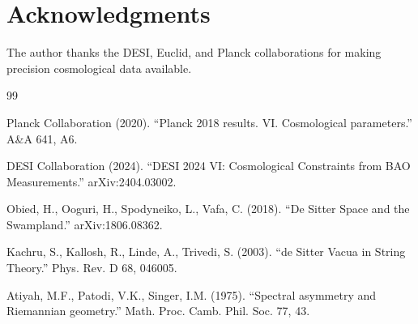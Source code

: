 \documentclass[12pt,a4paper]{article}
\begin{document}
\section*{Acknowledgments}

The author thanks the DESI, Euclid, and Planck collaborations for making precision cosmological data available.

\begin{thebibliography}{99}

Planck Collaboration (2020). ``Planck 2018 results. VI. Cosmological parameters.'' A\&A 641, A6.

DESI Collaboration (2024). ``DESI 2024 VI: Cosmological Constraints from BAO Measurements.'' arXiv:2404.03002.

Obied, H., Ooguri, H., Spodyneiko, L., Vafa, C. (2018). ``De Sitter Space and the Swampland.'' arXiv:1806.08362.

Kachru, S., Kallosh, R., Linde, A., Trivedi, S. (2003). ``de Sitter Vacua in String Theory.'' Phys. Rev. D 68, 046005.

Atiyah, M.F., Patodi, V.K., Singer, I.M. (1975). ``Spectral asymmetry and Riemannian geometry.'' Math. Proc. Camb. Phil. Soc. 77, 43.

\end{thebibliography}
\end{document}
